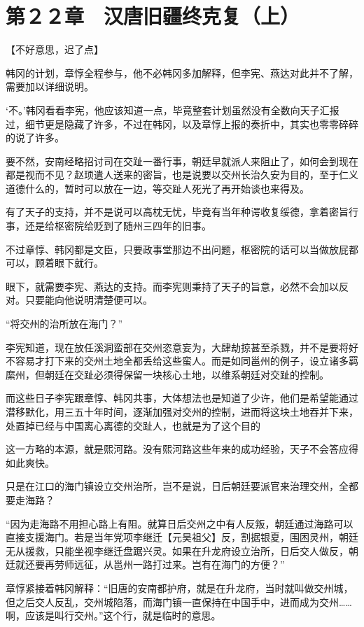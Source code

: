 \section{第２２章　汉唐旧疆终克复（上）}

【不好意思，迟了点】

韩冈的计划，章惇全程参与，他不必韩冈多加解释，但李宪、燕达对此并不了解，需要加以详细说明。

‘不。’韩冈看看李宪，他应该知道一点，毕竟整套计划虽然没有全数向天子汇报过，细节更是隐藏了许多，不过在韩冈，以及章惇上报的奏折中，其实也零零碎碎的说了许多。

要不然，安南经略招讨司在交趾一番行事，朝廷早就派人来阻止了，如何会到现在都是视而不见？赵顼遣人送来的密旨，也是说要以交州长治久安为目的，至于仁义道德什么的，暂时可以放在一边，等交趾人死光了再开始谈也来得及。

有了天子的支持，并不是说可以高枕无忧，毕竟有当年种谔收复绥德，拿着密旨行事，还是给枢密院给贬到了随州三四年的旧事。

不过章惇、韩冈都是文臣，只要政事堂那边不出问题，枢密院的话可以当做放屁都可以，顾着眼下就行。

眼下，就需要李宪、燕达的支持。而李宪则秉持了天子的旨意，必然不会加以反对。只要能向他说明清楚便可以。

“将交州的治所放在海门？”

李宪知道，现在放任溪洞蛮部在交州恣意妄为，大肆劫掠甚至杀戮，并不是要将好不容易才打下来的交州土地全都丢给这些蛮人。而是如同邕州的例子，设立诸多羁縻州，但朝廷在交趾必须得保留一块核心土地，以维系朝廷对交趾的控制。

而这些日子李宪跟章惇、韩冈共事，大体想法也是知道了少许，他们是希望能通过潜移默化，用三五十年时间，逐渐加强对交州的控制，进而将这块土地吞并下来，处置掉已经与中国离心离德的交趾人，也就是为了这个目的

这一方略的本源，就是熙河路。没有熙河路这些年来的成功经验，天子不会答应得如此爽快。

只是在江口的海门镇设立交州治所，岂不是说，日后朝廷要派官来治理交州，全都要走海路？

“因为走海路不用担心路上有阻。就算日后交州之中有人反叛，朝廷通过海路可以直接支援海门。若是当年党项李继迁【元昊祖父】反，割据银夏，围困灵州，朝廷无从援救，只能坐视李继迁盘踞兴灵。如果在升龙府设立治所，日后交人做反，朝廷就还要再劳师远征，从邕州一路打过来。岂有在海门的方便？”

章惇紧接着韩冈解释：“旧唐的安南都护府，就是在升龙府，当时就叫做交州城，但之后交人反乱，交州城陷落，而海门镇一直保持在中国手中，进而成为交州……啊，应该是叫行交州。”这个行，就是临时的意思。

